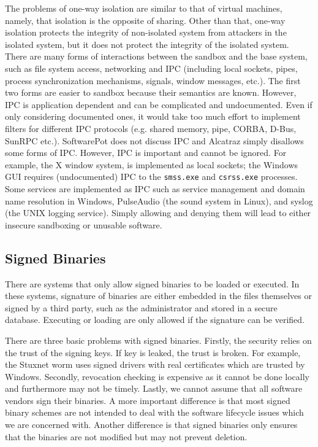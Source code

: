 The problems of one-way isolation are similar to that of
virtual machines, namely, that isolation is the opposite of sharing.
Other than that, one-way isolation protects the integrity of non-isolated
system from attackers in the isolated system,
but it does not protect the integrity of the isolated system.
There are many forms of interactions between the sandbox and the base system,
such as file system access, networking and IPC
(including local sockets, pipes, process synchronization mechanisms,
signals, window messages, etc.).
The first two forms are easier to sandbox because their semantics are known.
However, IPC is application dependent and can be complicated and
undocumented.
Even if only considering documented ones,
it would take too much effort to implement filters for different IPC
protocols (e.g. shared memory, pipe, CORBA, D-Bus, SunRPC etc.).
SoftwarePot does not discuss IPC and Alcatraz simply disallows some forms of IPC.
However, IPC is important and cannot be ignored.
For example, the X window system, is implemented as local sockets;
the Windows GUI requires (undocumented) IPC to the {\tt smss.exe}
and {\tt csrss.exe} processes.
Some services are implemented as IPC such as
service management and domain name resolution in Windows,
PulseAudio (the sound system in Linux),
and syslog (the UNIX logging service).
Simply allowing and denying them will lead to either insecure sandboxing or
unusable software.

\subsection{Signed Binaries}
\label{sec:signing}

There are systems \cite{binauth, digsig, williams, signedexec, FOOD}
that only allow signed binaries to be loaded or executed.
In these systems, signature of binaries are either embedded
in the files themselves or signed by a third party, such
as the administrator and stored in a secure database.
Executing or loading are only allowed if the signature can be verified.

There are three basic problems with signed binaries.
Firstly, the security relies on the trust of the signing keys.
If key is leaked, the trust is broken.
For example, the Stuxnet worm \cite{stuxnet} uses
signed drivers with real certificates which are trusted by Windows.
Secondly, revocation checking is expensive as it cannot be done
locally and furthermore may not be timely.
Lastly, we cannot assume that all software vendors sign their binaries.
A more important difference is that most signed binary schemes are not
intended to deal with the software lifecycle issues which we are concerned with.
Another difference is that signed binaries
only ensures that the binaries are not modified but
may not prevent deletion.

